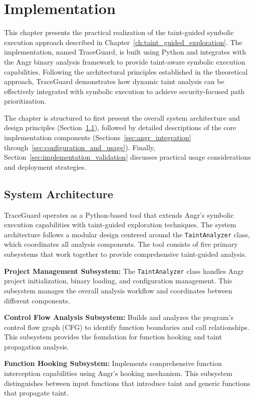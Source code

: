 \chapter{Implementation}

This chapter presents the practical realization of the taint-guided symbolic execution approach described in Chapter~\ref{ch:taint_guided_exploration}. The implementation, named TraceGuard, is built using Python and integrates with the Angr binary analysis framework to provide taint-aware symbolic execution capabilities. Following the architectural principles established in the theoretical approach, TraceGuard demonstrates how dynamic taint analysis can be effectively integrated with symbolic execution to achieve security-focused path prioritization.

The chapter is structured to first present the overall system architecture and design principles (Section~\ref{sec:system_architecture}), followed by detailed descriptions of the core implementation components (Sections~\ref{sec:angr_integration} through~\ref{sec:configuration_and_usage}). Finally, Section~\ref{sec:implementation_validation} discusses practical usage considerations and deployment strategies.

\section{System Architecture}\label{sec:system_architecture}

TraceGuard operates as a Python-based tool that extends Angr's symbolic execution capabilities with taint-guided exploration techniques. The system architecture follows a modular design centered around the \texttt{TaintAnalyzer} class, which coordinates all analysis components. The tool consists of five primary subsystems that work together to provide comprehensive taint-guided analysis.

\textbf{Project Management Subsystem:} The \texttt{TaintAnalyzer} class handles Angr project initialization, binary loading, and configuration management. This subsystem manages the overall analysis workflow and coordinates between different components.

\textbf{Control Flow Analysis Subsystem:} Builds and analyzes the program's control flow graph (CFG) to identify function boundaries and call relationships. This subsystem provides the foundation for function hooking and taint propagation analysis.

\textbf{Function Hooking Subsystem:} Implements comprehensive function interception capabilities using Angr's hooking mechanism. This subsystem distinguishes between input functions that introduce taint and generic functions that propagate taint.

